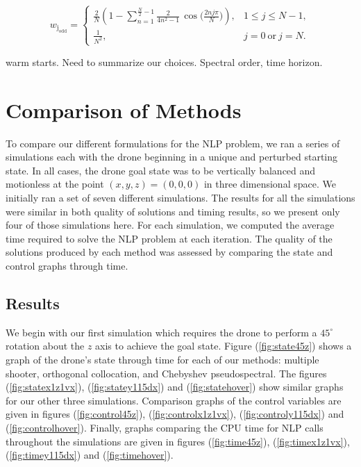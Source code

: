 \documentclass[]{article}
\begin{document}
	\[
        w_{\mathrm{j_{odd}}} =
        \begin{cases}
        \displaystyle
        \frac{2}{N}\!\left(
        1 - \sum_{n=1}^{\frac{N}{2}-1} \frac{2}{4n^{2}-1}\,
        \cos\!\Big(\tfrac{2 n j \pi}{N}\Big)
        \right), & 1 \le j \le N-1, \\[2ex]
        \displaystyle \frac{1}{N^{2}}, & j=0\ \text{or}\ j=N.
        \end{cases}
        \]

warm starts.
Need to summarize our choices.  Spectral order, time horizon.

\section*{Comparison of Methods}

To compare our different formulations for the NLP problem, we ran a series of simulations each with the drone beginning in a unique and perturbed starting state. In all cases, the drone goal state was to be vertically balanced and motionless at the point $(x,y,z) = (0, 0, 0)$ in three dimensional space. We initially ran a set of seven different simulations. The results for all the simulations were similar in both quality of solutions and timing results, so we present only four of those simulations here.  For each simulation, we computed the average time required to solve the NLP problem at each iteration. The quality of the solutions produced by each method was assessed by comparing the state and control graphs through time. 


\subsection*{Results}
We begin with our first simulation which requires the drone to perform a $45^{\circ}$ rotation about the $z$ axis to achieve the goal state. 
Figure (\ref{fig:state45z}) shows a graph of the drone's state through time for each of our methods:  multiple shooter, orthogonal collocation, and Chebyshev pseudospectral. The figures  (\ref{fig:statex1z1vx}), (\ref{fig:statey115dx}) and (\ref{fig:statehover}) show similar graphs for our other three simulations.  Comparison graphs of the control variables are given in figures (\ref{fig:control45z}), (\ref{fig:controlx1z1vx}), (\ref{fig:controly115dx}) and (\ref{fig:controlhover}). Finally, graphs comparing the CPU time for NLP calls throughout the simulations are given in figures (\ref{fig:time45z}), (\ref{fig:timex1z1vx}), (\ref{fig:timey115dx}) and (\ref{fig:timehover}). 
 
\end{document}
